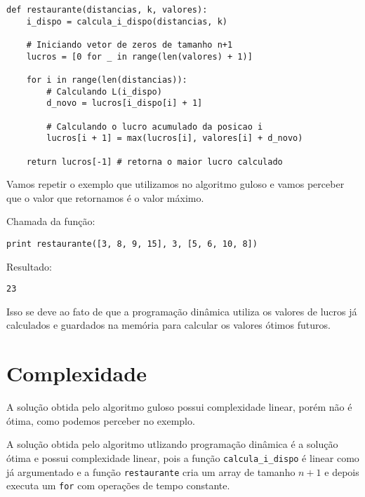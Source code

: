\documentclass[11pt]{article}
\begin{document}
\begin{verbatim}
def restaurante(distancias, k, valores):
    i_dispo = calcula_i_dispo(distancias, k)

    # Iniciando vetor de zeros de tamanho n+1
    lucros = [0 for _ in range(len(valores) + 1)]

    for i in range(len(distancias)):
        # Calculando L(i_dispo)
        d_novo = lucros[i_dispo[i] + 1]

        # Calculando o lucro acumulado da posicao i
        lucros[i + 1] = max(lucros[i], valores[i] + d_novo)

    return lucros[-1] # retorna o maior lucro calculado
\end{verbatim}

Vamos repetir o exemplo que utilizamos no algoritmo guloso e vamos
perceber que o valor que retornamos é o valor máximo.

Chamada da função:
\begin{verbatim}
print restaurante([3, 8, 9, 15], 3, [5, 6, 10, 8])
\end{verbatim}

Resultado:

\begin{verbatim}
23
\end{verbatim}

Isso se deve ao fato de que a programação dinâmica utiliza os valores
de lucros já calculados e guardados na memória para calcular os
valores ótimos futuros.

\section{Complexidade}
\label{sec-4}
\label{sec-5}


A solução obtida pelo algoritmo guloso possui complexidade linear,
porém não é ótima, como podemos perceber no exemplo.

A solução obtida pelo algoritmo utlizando programação dinâmica é a
solução ótima e possui complexidade linear, pois a função
\verb~calcula_i_dispo~ é linear como já argumentado e a função
\verb~restaurante~ cria um array de tamanho $n+1$ e depois executa um
\verb~for~ com operações de tempo constante.
\end{document}
